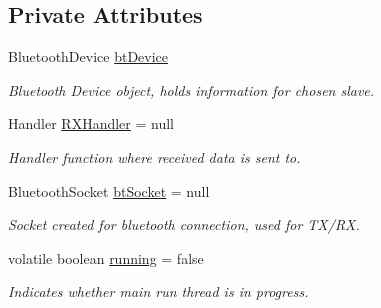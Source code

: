 \subsection*{Private Attributes}
\begin{DoxyCompactItemize}
\item 
\mbox{\label{classcom_1_1jack_1_1motorbikestatistics_1_1_b_t_connection_af49e78cef4253d96f009a9a1473e038d}} 
Bluetooth\+Device \hyperlink{classcom_1_1jack_1_1motorbikestatistics_1_1_b_t_connection_af49e78cef4253d96f009a9a1473e038d}{bt\+Device}
\begin{DoxyCompactList}\small\item\em Bluetooth Device object, holds information for chosen slave. \end{DoxyCompactList}\item 
\mbox{\label{classcom_1_1jack_1_1motorbikestatistics_1_1_b_t_connection_a64fc7b02a2b9f052c6b05842b79b3cdc}} 
Handler \hyperlink{classcom_1_1jack_1_1motorbikestatistics_1_1_b_t_connection_a64fc7b02a2b9f052c6b05842b79b3cdc}{R\+X\+Handler} = null
\begin{DoxyCompactList}\small\item\em Handler function where received data is sent to. \end{DoxyCompactList}\item 
\mbox{\label{classcom_1_1jack_1_1motorbikestatistics_1_1_b_t_connection_a0d47f94a35f7c8a07429975446e7b33b}} 
Bluetooth\+Socket \hyperlink{classcom_1_1jack_1_1motorbikestatistics_1_1_b_t_connection_a0d47f94a35f7c8a07429975446e7b33b}{bt\+Socket} = null
\begin{DoxyCompactList}\small\item\em Socket created for bluetooth connection, used for T\+X/\+RX. \end{DoxyCompactList}\item 
\mbox{\label{classcom_1_1jack_1_1motorbikestatistics_1_1_b_t_connection_a6193b7b92b7f2905a3a43d63db40aba8}} 
volatile boolean \hyperlink{classcom_1_1jack_1_1motorbikestatistics_1_1_b_t_connection_a6193b7b92b7f2905a3a43d63db40aba8}{running} = false
\begin{DoxyCompactList}\small\item\em Indicates whether main run thread is in progress. \end{DoxyCompactList}\end{DoxyCompactItemize}
